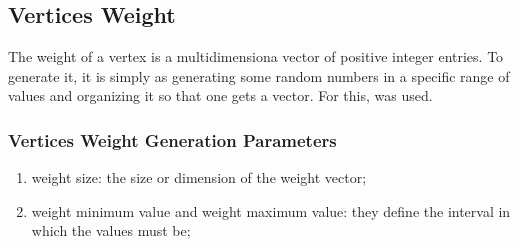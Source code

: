 \subsection{Vertices Weight}

The weight of a vertex is a multidimensiona vector of positive integer entries. To generate it, it is simply as generating some random numbers in a specific range of values and organizing it so that one gets a vector. For this, \cite{bib:numpy} was used.

\subsubsection{Vertices Weight Generation Parameters}

\begin{enumerate}
    \item weight size: the size or dimension of the weight vector;
    \item weight minimum value and weight maximum value: they define the interval in which the values must be;
\end{enumerate}

